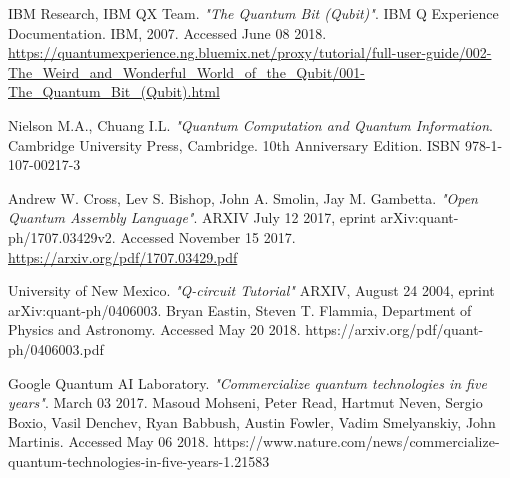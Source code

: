 \documentclass[a4paper]{article}
\begin{document}
\begin{thebibliography}{9}
	\label{sec:bibliography} %




	IBM Research, IBM QX Team. \emph{"The Quantum Bit (Qubit)"}. IBM Q Experience Documentation. IBM, 2007.  Accessed June 08 2018. 	\href{https://quantumexperience.ng.bluemix.net/proxy/tutorial/full-user-guide/002-The_Weird_and_Wonderful_World_of_the_Qubit/001-The_Quantum_Bit_(Qubit).html}{https://quantumexperience.ng.bluemix.net/proxy/tutorial/full-user-guide/002-The\_Weird\_and\_Wonderful\_World\_of\_the\_Qubit/001-The\_Quantum\_Bit\_(Qubit).html}

	Nielson M.A., Chuang I.L. \emph{"Quantum Computation and Quantum Information}. Cambridge University Press, Cambridge. 10th Anniversary Edition. ISBN 978-1-107-00217-3

	Andrew W. Cross, Lev S. Bishop, John A. Smolin, Jay M. Gambetta. \emph{"Open Quantum Assembly Language"}. ARXIV July 12 2017, eprint arXiv:quant-ph/1707.03429v2. Accessed November 15 2017. \href{https://arxiv.org/pdf/1707.03429.pdf}{https://arxiv.org/pdf/1707.03429.pdf}

	University of New Mexico. \emph{"Q-circuit Tutorial"} ARXIV, August 24 2004, eprint arXiv:quant-ph/0406003. Bryan Eastin, Steven T. Flammia, Department of Physics and Astronomy. Accessed May 20 2018. https://arxiv.org/pdf/quant-ph/0406003.pdf 

	Google Quantum AI Laboratory. \emph{"Commercialize quantum technologies in five years"}. March 03 2017. Masoud Mohseni, Peter Read, Hartmut Neven, Sergio Boxio, Vasil Denchev, Ryan Babbush, Austin Fowler, Vadim Smelyanskiy, John Martinis.  Accessed May 06 2018.  https://www.nature.com/news/commercialize-quantum-technologies-in-five-years-1.21583


\end{thebibliography}
\end{document}
